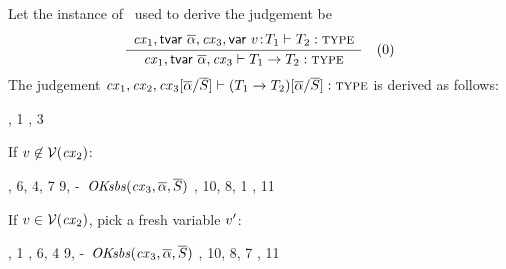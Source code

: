\begin{bycase}
\Case{\Rtarr}\\
Let the instance of \Rtarr\ used to derive the judgement be
\[
\frac{\begin{array}{c}\mathit{cx}_1,\mathsf{tvar}\ \overline{\alpha},\mathit{cx}_3,\mathsf{var}\ v\!:\!T_1\vdash T_2:\textsc{type}\end{array}}{\mathit{cx}_1,\mathsf{tvar}\ \overline{\alpha},\mathit{cx}_3\vdash T_1\to T_2:\textsc{type}}\quad\mbox{(0)}
\]
The judgement
$\mathit{cx}_1,\mathit{cx}_2,\mathit{cx}_3[\overline{\alpha}/\overline{S}]\vdash(T_1\to T_2)[\overline{\alpha}/\overline{S}]:\textsc{type}$ is derived as follows:
\begin{derivation}
     {, 1}
     {\indhyp, 3}
\end{derivation}
If $v\not\in\mathcal{V}(\mathit{cx}_2)$:
\begin{derivatioN}{6}
     {\Rcxvdec, 6, 4, 7}
     {9, \hyp\ $\mathit{OKsbs}(\mathit{cx}_3,\overline{\alpha},\overline{S})$}
     {\indhyp, 10, 8, 1}
     {\Rtarr, 11}
\end{derivatioN}
If $v\in\mathcal{V}(\mathit{cx}_2)$, pick a fresh variable $v'$:
\begin{derivatioN}{6}
     {, 1}
     {\Rcxvdec, 6, 4}
     {9, \hyp\ $\mathit{OKsbs}(\mathit{cx}_3,\overline{\alpha},\overline{S})$}
     {\indhyp, 10, 8, 7}
     {\Rtarr, 11}
\end{derivatioN}


\end{bycase}
